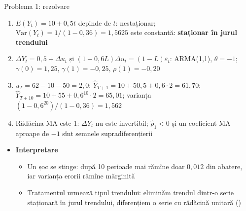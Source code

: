 \begin{frame}{Problema 1: rezolvare}
\itemsize{\footnotesize}
\begin{enumerate}
    \item $E(Y_t) = 10 + 0{,}5t$ depinde de $t$: nestaționar; $\mathrm{Var}(Y_t) = 1/(1 - 0{,}36) = 1{,}5625$ este constantă: \textbf{staționar în jurul trendului}
    \item $\Delta Y_t = 0{,}5 + \Delta u_t$ și $(1 - 0{,}6L)\Delta u_t = (1 - L)\varepsilon_t$: ARMA(1,1), $\theta = -1$; $\gamma(0) = 1{,}25$, $\gamma(1) = \ensuremath{-}0{,}25$, $\rho(1) = \ensuremath{-}0{,}20$
    \item $u_T = 62 - 10 - 50 = 2{,}0$; $\hat Y_{T+1} = 10 + 50{,}5 + 0{,}6 \cdot 2 = 61{,}70$; $\hat Y_{T+10} = 10 + 55 + 0{,}6^{10} \cdot 2 = 65{,}01$; varianța $(1 - 0{,}6^{20})/(1 - 0{,}36) = 1{,}562$
    \item Rădăcina MA este 1: $\Delta Y_t$ nu este invertibil; $\hat\rho_1 < 0$ și un coeficient MA aproape de $-1$ sînt semnele supradiferențierii
\end{enumerate}
\begin{itemize}
    \item \textbf{Interpretare}
    \begin{itemize}
        \item Un șoc se stinge: după 10 perioade mai rămîne doar $0{,}012$ din abatere, iar varianța erorii rămîne mărginită
        \item Tratamentul urmează tipul trendului: eliminăm trendul dintr-o serie staționară în jurul trendului, diferențiem o serie cu rădăcină unitară ()
    \end{itemize}
\end{itemize}
\end{frame}

